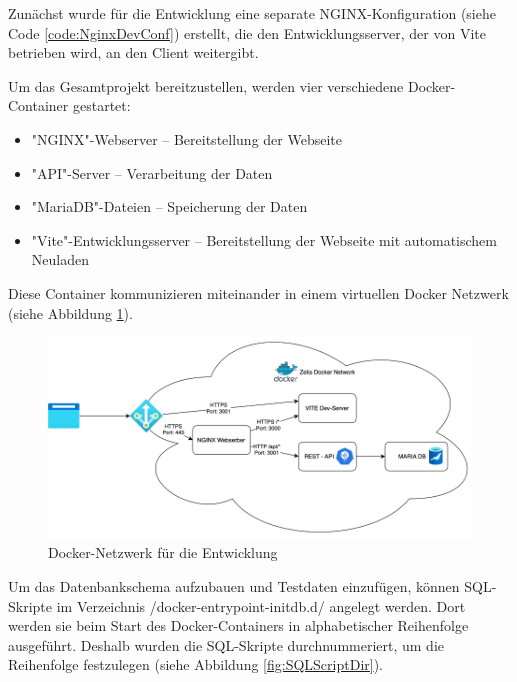  \label{sec:dockerDevImpl}

Zunächst wurde für die Entwicklung eine separate NGINX-Konfiguration (siehe Code \ref{code:NginxDevConf}) erstellt, die den Entwicklungsserver, der von Vite betrieben wird, an den Client weitergibt.


Um das Gesamtprojekt bereitzustellen, werden vier verschiedene Docker-Container gestartet:

\begin{itemize}
    \item "NGINX"-Webserver -- Bereitstellung der Webseite
    \item "API"-Server -- Verarbeitung der Daten
    \item "MariaDB"-Dateien -- Speicherung der Daten
    \item "Vite"-Entwicklungsserver -- Bereitstellung der Webseite mit automatischem Neuladen
\end{itemize}

Diese Container kommunizieren miteinander in einem virtuellen Docker Netzwerk (siehe Abbildung \ref{fig:DockerDevNetwork}). 

\begin{figure}[H]
    \centering
    \includegraphics[width=\textwidth]{media/Docker/DevNetwork.png}
    \caption{Docker-Netzwerk für die Entwicklung}
    \label{fig:DockerDevNetwork}
\end{figure}

Um das Datenbankschema aufzubauen und Testdaten einzufügen, können SQL-Skripte im Verzeichnis {\ttfamily /docker-entrypoint-initdb.d/} angelegt werden. Dort werden sie beim Start des Docker-Containers in alphabetischer Reihenfolge ausgeführt. Deshalb wurden die SQL-Skripte durchnummeriert, um die Reihenfolge festzulegen (siehe Abbildung \ref{fig:SQLScriptDir}).

